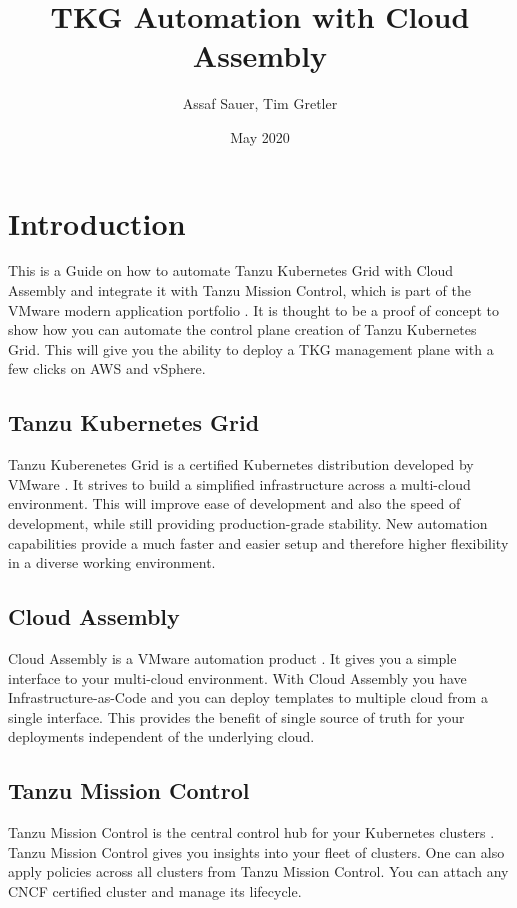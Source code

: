 \documentclass{article}
\title{TKG Automation with Cloud Assembly}
\author{Assaf Sauer, Tim Gretler}
\affil{Vmware Inc.}
\date{May 2020}
\begin{document}
\maketitle


\newpage
\tableofcontents
\newpage


\section{Introduction}
This is a Guide on how to automate Tanzu Kubernetes Grid with Cloud Assembly and integrate it with Tanzu Mission Control, which is part of the VMware modern application portfolio \citep{tanzu}. It is thought to be a proof of concept to show how you can automate the control plane creation of Tanzu Kubernetes Grid. This will give you the ability to deploy a TKG management plane with a few clicks on AWS and vSphere. 

\subsection{Tanzu Kubernetes Grid}
Tanzu Kuberenetes Grid is a certified Kubernetes distribution developed by VMware \citep{tkg}. It strives to build a simplified infrastructure across a multi-cloud environment. This will improve ease of development and also the speed of development, while still providing production-grade stability. New automation capabilities provide a much faster and easier setup and therefore higher flexibility in a diverse working environment. 

\subsection{Cloud Assembly}
Cloud Assembly is a VMware automation product \citep{cloudassembly}. It gives you a simple interface to your multi-cloud environment. With Cloud Assembly you have Infrastructure-as-Code and you can deploy templates to multiple cloud from a single interface. This provides the benefit of single source of truth for your deployments independent of the underlying cloud. 


\subsection{Tanzu Mission Control}
Tanzu Mission Control is the central control hub for your Kubernetes clusters \citep{tmc}. Tanzu Mission Control gives you insights into your fleet of clusters. One can also apply policies across all clusters from Tanzu Mission Control. You can attach any CNCF certified cluster and manage its lifecycle.
\end{document}
